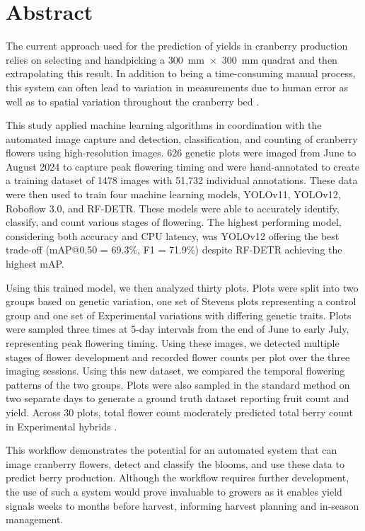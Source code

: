 \section{Abstract}

\begin{singlespace}
    
The current approach used for the prediction of yields in cranberry production relies on selecting and handpicking a 300~mm~$\times$~300~mm quadrat and then extrapolating this result. In addition to being a time-consuming manual process, this system can often lead to variation in measurements due to human error as well as to spatial variation throughout the cranberry bed \cite{pozdnyakova_estimation_2002}.

This study applied machine learning algorithms in coordination with the automated image capture and detection, classification, and counting of cranberry flowers using high-resolution images. 626 genetic plots were imaged from June to August 2024 to capture peak flowering timing and were hand-annotated to create a training dataset of 1478 images with 51,732 individual annotations. These data were then used to train four machine learning models, YOLOv11, YOLOv12, Roboflow 3.0, and RF-DETR. These models were able to accurately identify, classify, and count various stages of flowering. The highest performing model, considering both accuracy and CPU latency, was YOLOv12 offering the best trade-off (mAP@0.50 = 69.3\%, F1 = 71.9\%) despite RF-DETR achieving the highest mAP.

Using this trained model, we then analyzed thirty plots. Plots were split into two groups based on genetic variation, one set of Stevens plots representing a control group and one set of Experimental variations with differing genetic traits. Plots were sampled three times at 5-day intervals from the end of June to early July, representing peak flowering timing. Using these images, we detected multiple stages of flower development and recorded flower counts per plot over the three imaging sessions. Using this new dataset, we compared the temporal flowering patterns of the two groups. Plots were also sampled in the standard method on two separate days to generate a ground truth dataset reporting fruit count and yield. Across 30 plots, total flower count moderately predicted total berry count in Experimental hybrids .

This workflow demonstrates the potential for an automated system that can image cranberry flowers, detect and classify the blooms, and use these data to predict berry production. Although the workflow requires further development, the use of such a system would prove invaluable to growers as it enables yield signals weeks to months before harvest, informing harvest planning and in-season management.

\end{singlespace}

